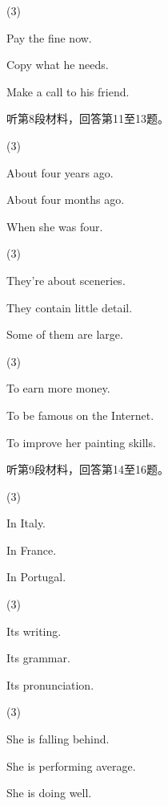 \documentclass{英语试卷}
\begin{document}
\begin{choices}(3)
  \item Pay the fine now.
  \item Copy what he needs.
  \item Make a call to his friend.
\end{choices}
\par 听第8段材料，回答第11至13题。\par
{}
\begin{choices}(3)
  \item About four years ago.
  \item About four months ago.
  \item When she was four.
\end{choices}
\begin{choices}(3)
  \item They're about sceneries.
  \item They contain little detail.
  \item Some of them are large.
\end{choices}
\begin{choices}(3)
  \item To earn more money.
  \item To be famous on the Internet.
  \item To improve her painting skills.
\end{choices}
\par 听第9段材料，回答第14至16题。\par
{}
\begin{choices}(3)
  \item In Italy.
  \item In France.
  \item In Portugal.
\end{choices}
\begin{choices}(3)
  \item Its writing.
  \item Its grammar.
  \item Its pronunciation.
\end{choices}
\begin{choices}(3)
  \item She is falling behind.
  \item She is performing average.
  \item She is doing well.
\end{choices}
\end{document}
